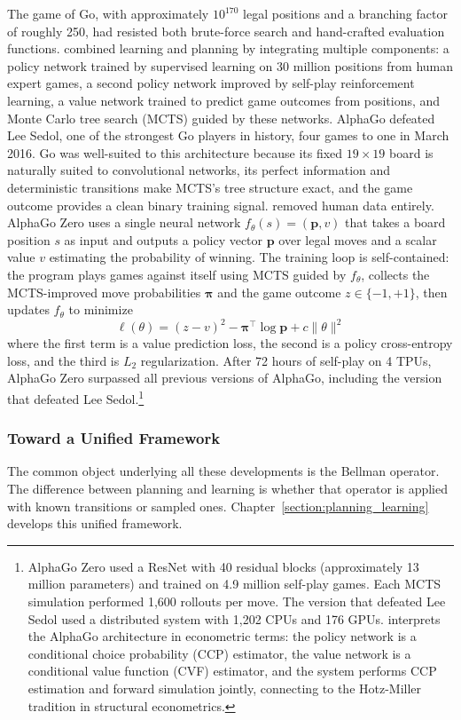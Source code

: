 The game of Go, with approximately $10^{170}$ legal positions and a branching factor of roughly 250, had resisted both brute-force search and hand-crafted evaluation functions. \citet{Silver2016} combined learning and planning by integrating multiple components: a policy network trained by supervised learning on 30 million positions from human expert games, a second policy network improved by self-play reinforcement learning, a value network trained to predict game outcomes from positions, and Monte Carlo tree search (MCTS) guided by these networks. AlphaGo defeated Lee Sedol, one of the strongest Go players in history, four games to one in March 2016. Go was well-suited to this architecture because its fixed $19 \times 19$ board is naturally suited to convolutional networks, its perfect information and deterministic transitions make MCTS's tree structure exact, and the game outcome provides a clean binary training signal. \citet{Silver2017} removed human data entirely. AlphaGo Zero uses a single neural network $f_\theta(s) = (\mathbf{p}, v)$ that takes a board position $s$ as input and outputs a policy vector $\mathbf{p}$ over legal moves and a scalar value $v$ estimating the probability of winning. The training loop is self-contained: the program plays games against itself using MCTS guided by $f_\theta$, collects the MCTS-improved move probabilities $\boldsymbol{\pi}$ and the game outcome $z \in \{-1, +1\}$, then updates $f_\theta$ to minimize
\begin{equation}
\ell(\theta) = (z - v)^2 - \boldsymbol{\pi}^\top \log \mathbf{p} + c \|\theta\|^2
\end{equation}
where the first term is a value prediction loss, the second is a policy cross-entropy loss, and the third is $L_2$ regularization. After 72 hours of self-play on 4 TPUs, AlphaGo Zero surpassed all previous versions of AlphaGo, including the version that defeated Lee Sedol.\footnote{AlphaGo Zero used a ResNet with 40 residual blocks (approximately 13 million parameters) and trained on 4.9 million self-play games. Each MCTS simulation performed 1{,}600 rollouts per move. The version that defeated Lee Sedol used a distributed system with 1{,}202 CPUs and 176 GPUs. \citet{Igami2020} interprets the AlphaGo architecture in econometric terms: the policy network is a conditional choice probability (CCP) estimator, the value network is a conditional value function (CVF) estimator, and the system performs CCP estimation and forward simulation jointly, connecting to the Hotz-Miller tradition in structural econometrics.}

\subsubsection{Toward a Unified Framework}

The common object underlying all these developments is the Bellman operator. The difference between planning and learning is whether that operator is applied with known transitions or sampled ones. Chapter~\ref{section:planning_learning} develops this unified framework.
